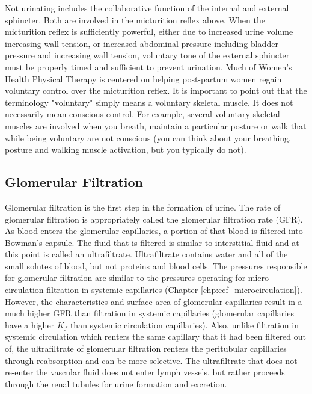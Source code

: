 Not urinating includes the collaborative function of the internal and external sphincter. Both are involved in the micturition reflex above. When the micturition reflex is sufficiently powerful, either due to increased urine volume increasing wall tension, or increased abdominal pressure including bladder pressure and increasing wall tension, voluntary tone of the external sphincter must be properly timed and sufficient to prevent urination. Much of Women's Health Physical Therapy is centered on helping post-partum women regain voluntary control over the micturition reflex. It is important to point out that the terminology "voluntary" simply means a voluntary skeletal muscle. It does not necessarily mean conscious control. For example, several voluntary skeletal muscles are involved when you breath, maintain a particular posture or walk that while being voluntary are not conscious (you can think about your breathing, posture and walking muscle activation, but you typically do not).


\subsection{Glomerular Filtration}

Glomerular filtration is the first step in the formation of urine. The rate of glomerular filtration is appropriately called the glomerular filtration rate (GFR). As blood enters the glomerular capillaries, a portion of that blood is filtered into Bowman’s capsule. The fluid that is filtered is similar to interstitial fluid and at this point is called an ultrafiltrate. Ultrafiltrate contains water and all of the small solutes of blood, but not proteins and blood cells. The pressures responsible for glomerular filtration are similar to the pressures operating for micro-circulation filtration in systemic capillaries (Chapter \ref{chp:ecf_microcirculation}). However, the characteristics and surface area of glomerular capillaries result in a much higher GFR than filtration in systemic capillaries (glomerular capillaries have a higher $K_f$ than systemic circulation capillaries). Also, unlike filtration in systemic circulation which renters the same capillary that it had been filtered out of, the ultrafiltrate of glomerular filtration renters the peritubular capillaries through reabsorption and can be more selective. The ultrafiltrate that does not re-enter the vascular fluid does not enter lymph vessels, but rather proceeds through the renal tubules for urine formation and excretion.

